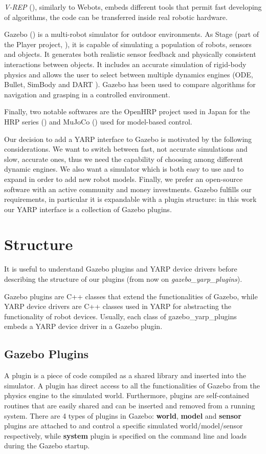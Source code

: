 \emph{V-REP} (\cite{conf/iros/RohmerSF13}), similarly to Webots, embeds different tools that permit fast developing of algorithms, the code can be transferred inside real robotic hardware. 

Gazebo (\cite{koenig2004design}) is a multi-robot simulator for outdoor environments. As Stage (part of the Player project, \cite{Gerkey03theplayer/stage}), it is capable of simulating a population of robots, sensors and objects. It generates both realistic sensor feedback and physically consistent interactions between objects. It includes an accurate simulation of rigid-body physics and allows the user to select between multiple dynamics engines (ODE, Bullet, SimBody \cite{Sherman2011241} and DART \cite{DART}). Gazebo has been used to compare algorithms for navigation and grasping in a controlled environment.

Finally, two notable softwares are the OpenHRP project used in Japan for the HRP series (\cite{journals/ijrr/KanehiroHK04}) and MuJoCo (\cite{conf/iros/TodorovET12}) used for model-based control.

Our decision to add a YARP interface to Gazebo is motivated by the following considerations.
We want to switch between fast, not accurate simulations and slow, accurate ones, thus we need the capability of choosing among different dynamic engines. We also want a simulator which is both easy to use and to expand in order to add new robot models. Finally, we prefer an open-source software with an active community and money investments.
Gazebo fulfills our requirements, in particular it is expandable with a plugin structure: in this work our YARP interface is a collection of Gazebo plugins. 




\section{Structure}\label{structure}
It is useful to understand Gazebo plugins and YARP device drivers before describing the structure of our plugins (from now on \emph{gazebo\_yarp\_plugins}).

Gazebo plugins are C++ classes that extend the functionalities of Gazebo, while YARP device drivers are C++ classes used in YARP for abstracting the functionality of robot devices.
Usually, each class of gazebo\_yarp\_plugins embeds a YARP device driver in a Gazebo plugin. 

\subsection{Gazebo Plugins}
A plugin is a piece of code compiled as a shared library and inserted into the simulator. A plugin has direct access to all the functionalities of Gazebo from the physics engine to the simulated world. Furthermore, plugins are self-contained routines that are easily shared and can be inserted and removed from a running system. There are 4 types of plugins in Gazebo: \textbf{world}, \textbf{model} and \textbf{sensor} plugins are attached to and control a specific simulated world/model/sensor respectively, while \textbf{system} plugin is specified on the command line and loads during the Gazebo startup.



